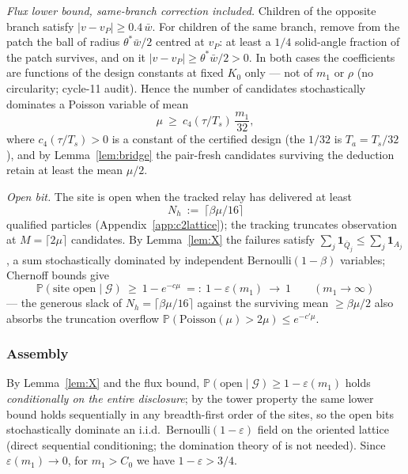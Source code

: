 \documentclass[11pt]{article}
\newcommand{\PP}{\mathbb{P}}
\newcommand{\Ts}{T_s}
\newcommand{\Ta}{T_a}
\newcommand{\wbar}{\bar w}
\begin{document}
\emph{Flux lower bound, same-branch correction included.} Children of the
opposite branch satisfy $|v-v_P|\ge0.4\,\wbar$. For children of the same
branch, remove from the patch the ball of radius $\theta^*\wbar/2$ centred
at $v_P$: at least a $1/4$ solid-angle fraction of the patch survives, and
on it $|v-v_P|\ge\theta^*\wbar/2>0$. In both cases the coefficients are
functions of the design constants at fixed $K_0$ only --- not of $m_1$ or
$\rho$ (no circularity; cycle-11 audit). Hence the number of candidates
stochastically dominates a Poisson variable of mean
\[
  \mu\ \ge\ c_4(\tau/\Ts)\,\frac{m_1}{32},
\]
where $c_4(\tau/\Ts)>0$ is a constant of the certified design (the $1/32$
is $\Ta=\Ts/32$), and by Lemma~\ref{lem:bridge} the pair-fresh candidates
surviving the deduction retain at least the mean $\mu/2$.

\emph{Open bit.} The site is open when the tracked relay has delivered at
least
\[
  N_h\ :=\ \lceil\beta\mu/16\rceil
\]
qualified particles (Appendix~\ref{app:c2lattice}); the tracking truncates
observation at $M=\lceil2\mu\rceil$ candidates. By Lemma~\ref{lem:X} the
failures satisfy $\sum_j\mathbf 1_{\bar Q_j}\le\sum_j\mathbf 1_{A_j}$, a
sum stochastically dominated by independent $\mathrm{Bernoulli}(1-\beta)$
variables; Chernoff bounds give
\[
  \PP(\text{site open}\mid\mathcal G)\ \ge\ 1-e^{-c\mu}\ =:\
  1-\varepsilon(m_1)\ \longrightarrow\ 1 \qquad(m_1\to\infty)
\]
--- the generous slack of $N_h=\lceil\beta\mu/16\rceil$ against the
surviving mean $\ge\beta\mu/2$ also absorbs the truncation overflow
$\PP(\mathrm{Poisson}(\mu)>2\mu)\le e^{-c'\mu}$.

\subsubsection{Assembly}\label{app:c2assembly}

By Lemma~\ref{lem:X} and the flux bound,
$\PP(\text{open}\mid\mathcal G)\ge1-\varepsilon(m_1)$ holds
\emph{conditionally on the entire disclosure}; by the tower property the
same lower bound holds sequentially in any breadth-first order of the
sites, so the open bits stochastically dominate an i.i.d.\
$\mathrm{Bernoulli}(1-\varepsilon)$ field on the oriented lattice (direct
sequential conditioning; the domination theory of \cite{lss97} is not
needed). Since $\varepsilon(m_1)\to0$, for $m_1>C_0$ we have
$1-\varepsilon>3/4$.
\end{document}
